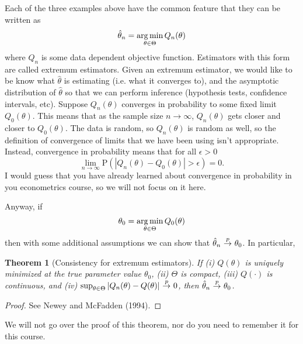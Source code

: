\documentclass[12pt,reqno]{amsart}
\newtheorem{theorem}{Theorem}[section]
\theoremstyle{definition}
\newcommand{\argmin}{\operatornamewithlimits{arg\,min}}
\def\inprobHIGH{\,{\buildrel p \over \rightarrow}\,}
\def\inprob{\,{\inprobHIGH}\,}
\renewcommand{\to}{{\rightarrow}}
\renewcommand{\Pr}{{\mathrm{P}}}
\begin{document}
Each of the three examples above have the common feature that they can
be written as 
\[ \hat{\theta}_n = \argmin_{\theta \in \Theta} Q_n(\theta) \]
where $Q_n$ is some data dependent objective function. Estimators with
this form are called extremum estimators. Given an extremum estimator,
we would like to be know what $\hat{\theta}$ is estimating (i.e. what
it converges to), and the asymptotic distribution of $\hat{\theta}$ so
that we can perform inference (hypothesis tests, confidence intervals,
etc). Suppose $Q_n(\theta)$ converges in probability to some fixed
limit $Q_0(\theta)$. This means that as the sample size $n \to
\infty$, $Q_n(\theta)$ gets closer and closer to $Q_0(\theta)$. The
data is random, so $Q_n(\theta)$ is random as well, so the definition
of convergence of limits that we have been using isn't
appropriate. Instead, convergence in probability means that for all
$\epsilon>0$ 
\[ \lim_{n\to \infty} \Pr(|Q_n(\theta) - Q_0(\theta)|>\epsilon) = 0. \]
I would guess that you have already learned about convergence in
probability in you econometrics course, so we will not focus on it
here. 

Anyway, if 
\[ \theta_0 = \argmin_{\theta \in \Theta} Q_0(\theta) \]
then with some additional assumptions we can show that $\hat{\theta}_n
\inprob \theta_0$. In particular,
\begin{theorem}[Consistency for extremum estimators]
  If (i) $Q(\theta)$ is uniquely minimized at the true parameter value
  $\theta_0$, (ii) $\Theta$ is compact, (iii) $Q(\cdot)$ is
  continuous, and (iv) $\sup_{\theta \in \Theta} |Q_n(\theta) -
  Q(\theta)| \inprob 0$, then $\hat{\theta}_n \inprob \theta_0$.
\end{theorem}
\begin{proof}
  See Newey and McFadden (1994). 
\end{proof}
We will not go over the proof of this theorem, nor do you need to
remember it for this course. 
\end{document}

